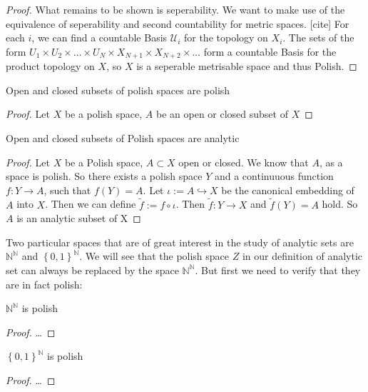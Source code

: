 \documentclass[10pt, a4paper, titlepage]{article}
\numberwithin{equation}{section}
\begin{document}
\begin{proof}
What remains to be shown is seperability. We want to make use of the equivalence of seperability and second countability for metric spaces. [cite]
For each $i$, we can find a countable Basis  $\mathcal{U}_i$ for the topology on $X_i$.
The sets of the form $U_1 \times U_2 \times \ldots \times U_N \times X_{N+1} \times X_{N+2} \times \ldots$ form a countable Basis for the product topology on $X$, 
so  $X$ is a seperable metrisable space and thus Polish.

\end{proof}

\begin{corollary}
	Open and closed subsets of polish spaces are polish
\end{corollary}


\begin{proof}
	Let $X$ be a polish space, $A$ be an open or closed subset of $X$
\end{proof}


\begin{theorem}
	Open and closed subsets of Polish spaces are analytic
\end{theorem}

\begin{proof}
	Let $X$ be a Polish space, $A \subset X$ open or closed.
	We know that $A$, as a space is polish. So there exists a polish space $Y$ and a continuuous function  $f:Y\to A$, such that  $f(Y) = A$. 
	Let $\iota := A \hookrightarrow X$ be the canonical embedding of  $A$ into  $X$. 
	Then we can define  $\tilde{f} := f \circ \iota$. Then  $\tilde{f}:Y \to X $ and  $\tilde{f}(Y) = A$ hold. So  $A$ is an analytic subset of X


\end{proof}

Two particular spaces that are of great interest in the study of analytic sets are $\mathbb{N}^{\mathbb{N}}$ and $\left\{ 0,1 \right\}^{\mathbb{N}} $.
We will see that the polish space $Z$ in our definition of analytic set can always be replaced by the space $\mathbb{N}^{\mathbb{N}}$. But first we need to verify that they are in fact polish:

\begin{theorem}
	$\mathbb{N}^\mathbb{N}$ is polish
\end{theorem}
\begin{proof}
	\ldots		
\end{proof}

\begin{theorem}
	$\left\{ 0,1 \right\}^\mathbb{N}$ is polish
\end{theorem}
\begin{proof}
	\ldots	
\end{proof}
\end{document}
